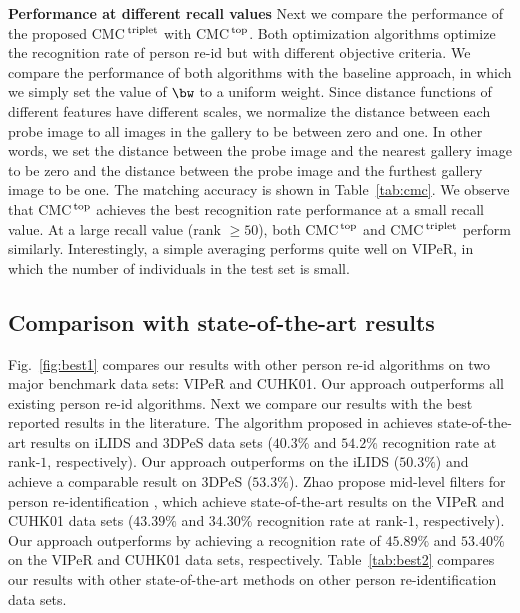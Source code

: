 \documentclass[10pt,twocolumn,letterpaper]{article}
\def\CMCstruct{{\rm CMC$^{\,\rm top}$}\xspace}
\def\CMCtriplet{{\rm CMC$^{\,\rm triplet}$}\xspace}
\renewcommand{\paragraph}{\textbf}
\begin{document}
\paragraph{Performance at different recall values}
%
%
Next we compare the performance of the proposed \CMCtriplet
with \CMCstruct.
Both optimization algorithms optimize the recognition
rate of person re-id but with different objective criteria.
We compare the performance of both algorithms
with the baseline approach, in which we simply set the value of
$\bw$ to a uniform weight.
Since distance functions of different features have different scales,
we normalize the distance between each probe image to all images in
the gallery to be between zero and one.
In other words,
we set the distance between the probe image and
the nearest gallery image
to be zero and the distance between
the probe image and the furthest gallery
image to be one.
The matching accuracy is shown in Table~\ref{tab:cmc}.
We observe that \CMCstruct achieves the best recognition rate performance
at a small recall value.
At a large recall value (rank $\geq 50$), both \CMCstruct and \CMCtriplet
perform similarly.
Interestingly, a simple averaging performs quite well on VIPeR, in
which the number of individuals in the test set is small.


%
\subsection{Comparison with state-of-the-art results}
%

Fig.~\ref{fig:best1} compares our results with
other person re-id algorithms on two
major benchmark data sets: VIPeR and CUHK01.
Our approach outperforms all existing person re-id algorithms.
%
%
Next we compare our results with
the best reported results in the literature.
%
%
%
The algorithm proposed in \cite{Xiong2014Person} achieves
state-of-the-art results on iLIDS and 3DPeS
data sets ($40.3\%$ and $54.2\%$ recognition rate at rank-$1$, respectively).
Our approach outperforms \cite{Xiong2014Person} on the iLIDS
($50.3\%$) and
achieve a comparable result on 3DPeS ($53.3\%$).
Zhao \etal propose mid-level
filters for person re-identification \cite{Zhao2014Learning},
which achieve state-of-the-art results on the VIPeR and CUHK01 data sets
($43.39\%$ and $34.30\%$ recognition rate at rank-$1$, respectively).
Our approach outperforms \cite{Zhao2014Learning} by
achieving a recognition rate of $45.89\%$ and $53.40\%$ on the
VIPeR and CUHK01 data sets, respectively.
Table~\ref{tab:best2} compares our results
with other state-of-the-art methods on other person
re-identification data sets.
\end{document}
